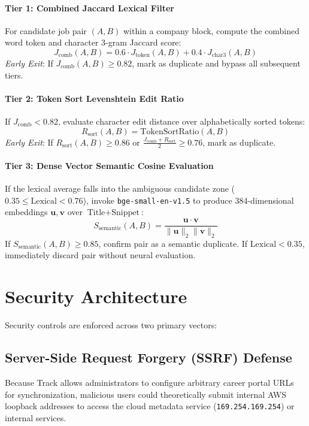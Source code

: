 \paragraph{Tier 1: Combined Jaccard Lexical Filter}
For candidate job pair $(A, B)$ within a company block, compute the combined word token and character 3-gram Jaccard score:
\begin{equation}
    J_{\text{comb}}(A, B) = 0.6 \cdot J_{\text{token}}(A, B) + 0.4 \cdot J_{\text{char3}}(A, B)
\end{equation}
\textit{Early Exit}: If $J_{\text{comb}}(A, B) \ge 0.82$, mark as duplicate and bypass all subsequent tiers.

\paragraph{Tier 2: Token Sort Levenshtein Edit Ratio}
If $J_{\text{comb}} < 0.82$, evaluate character edit distance over alphabetically sorted tokens:
\begin{equation}
    R_{\text{sort}}(A, B) = \text{TokenSortRatio}(A, B)
\end{equation}
\textit{Early Exit}: If $R_{\text{sort}}(A, B) \ge 0.86$ or $\frac{J_{\text{comb}} + R_{\text{sort}}}{2} \ge 0.76$, mark as duplicate.

\paragraph{Tier 3: Dense Vector Semantic Cosine Evaluation}
If the lexical average falls into the ambiguous candidate zone ($0.35 \le \text{Lexical} < 0.76$), invoke \texttt{bge-small-en-v1.5} to produce 384-dimensional embeddings $\mathbf{u}, \mathbf{v}$ over $\text{Title} + \text{Snippet}$:
\begin{equation}
    S_{\text{semantic}}(A, B) = \frac{\mathbf{u} \cdot \mathbf{v}}{\|\mathbf{u}\|_2 \|\mathbf{v}\|_2}
\end{equation}
If $S_{\text{semantic}}(A, B) \ge 0.85$, confirm pair as a semantic duplicate. If $\text{Lexical} < 0.35$, immediately discard pair without neural evaluation.

\section{Security Architecture}
Security controls are enforced across two primary vectors:

\subsection{Server-Side Request Forgery (SSRF) Defense}
Because Track allows administrators to configure arbitrary career portal URLs for synchronization, malicious users could theoretically submit internal AWS loopback addresses to access the cloud metadata service (\texttt{169.254.169.254}) or internal services. 

